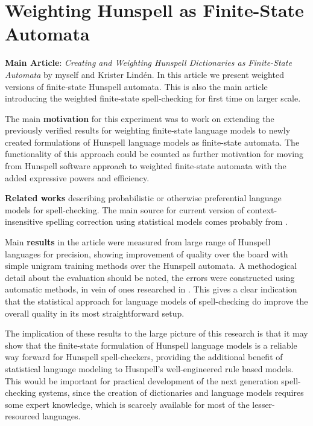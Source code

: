 \documentclass[officiallayout,draft]{unihelcompling}
\begin{document}
\section{Weighting Hunspell as Finite-State Automata}
\label{sec:hunspell-training}

\textbf{Main Article}: \emph{Creating and Weighting Hunspell Dictionaries as Finite-State Automata} by myself and Krister Lindén. In this article we present
weighted versions of finite-state Hunspell automata. This is also the main
article introducing the weighted finite-state spell-checking for first time
on larger scale.

The main \textbf{motivation} for this experiment was to work on extending the
previously verified results for weighting finite-state language models to newly
created formulations of Hunspell language models as finite-state automata. The
functionality of this approach could be counted as further motivation for
moving from Hunspell software approach to weighted finite-state automata with
the added expressive powers and efficiency.

\textbf{Related works} describing probabilistic or otherwise preferential
language models for spell-checking. The main source for current version of 
context-insensitive spelling correction using statistical models comes
probably from \citep{church1991probability}.

Main \textbf{results} in the article were measured from large range of Hunspell
languages for precision, showing improvement of quality over the board with
simple unigram training methods over the Hunspell automata. A methodogical
detail about the evaluation should be noted, the errors were constructed using
automatic methods, in vein of ones researched in
\citep{bigert2003autoeval,bigert2005automatic}. This gives a clear indication
that the statistical approach for language models of spell-checking do improve
the overall quality in its most straightforward setup.

The implication of these results to the large picture of this research is
that it may show that the finite-state formulation of Hunspell language models
is a reliable way forward for Hunspell spell-checkers, providing the additional
benefit of statistical language modeling to Husnpell's well-engineered
rule based models. This would be important for practical development of
the next generation spell-checking systems, since the creation of dictionaries
and language models requires some expert knowledge, which is scarcely available
for most of the lesser-resourced languages.
\end{document}
